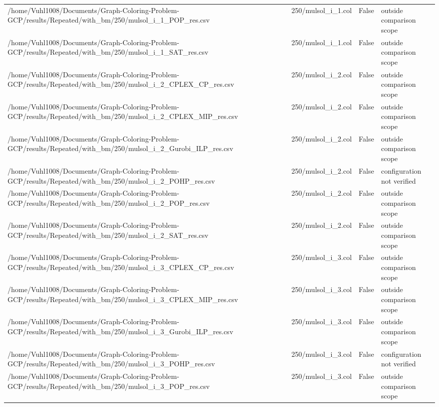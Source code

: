 \begin{table}[htbp]
\begin{tabular}{llll}
/home/Vuhl1008/Documents/Graph-Coloring-Problem-GCP/results/Repeated/with\_bm/250/mulsol\_i\_1\_POP\_res.csv & 250/mulsol\_i\_1.col & False & outside comparison scope \\
/home/Vuhl1008/Documents/Graph-Coloring-Problem-GCP/results/Repeated/with\_bm/250/mulsol\_i\_1\_SAT\_res.csv & 250/mulsol\_i\_1.col & False & outside comparison scope \\
/home/Vuhl1008/Documents/Graph-Coloring-Problem-GCP/results/Repeated/with\_bm/250/mulsol\_i\_2\_CPLEX\_CP\_res.csv & 250/mulsol\_i\_2.col & False & outside comparison scope \\
/home/Vuhl1008/Documents/Graph-Coloring-Problem-GCP/results/Repeated/with\_bm/250/mulsol\_i\_2\_CPLEX\_MIP\_res.csv & 250/mulsol\_i\_2.col & False & outside comparison scope \\
/home/Vuhl1008/Documents/Graph-Coloring-Problem-GCP/results/Repeated/with\_bm/250/mulsol\_i\_2\_Gurobi\_ILP\_res.csv & 250/mulsol\_i\_2.col & False & outside comparison scope \\
/home/Vuhl1008/Documents/Graph-Coloring-Problem-GCP/results/Repeated/with\_bm/250/mulsol\_i\_2\_POHP\_res.csv & 250/mulsol\_i\_2.col & False & configuration not verified \\
/home/Vuhl1008/Documents/Graph-Coloring-Problem-GCP/results/Repeated/with\_bm/250/mulsol\_i\_2\_POP\_res.csv & 250/mulsol\_i\_2.col & False & outside comparison scope \\
/home/Vuhl1008/Documents/Graph-Coloring-Problem-GCP/results/Repeated/with\_bm/250/mulsol\_i\_2\_SAT\_res.csv & 250/mulsol\_i\_2.col & False & outside comparison scope \\
/home/Vuhl1008/Documents/Graph-Coloring-Problem-GCP/results/Repeated/with\_bm/250/mulsol\_i\_3\_CPLEX\_CP\_res.csv & 250/mulsol\_i\_3.col & False & outside comparison scope \\
/home/Vuhl1008/Documents/Graph-Coloring-Problem-GCP/results/Repeated/with\_bm/250/mulsol\_i\_3\_CPLEX\_MIP\_res.csv & 250/mulsol\_i\_3.col & False & outside comparison scope \\
/home/Vuhl1008/Documents/Graph-Coloring-Problem-GCP/results/Repeated/with\_bm/250/mulsol\_i\_3\_Gurobi\_ILP\_res.csv & 250/mulsol\_i\_3.col & False & outside comparison scope \\
/home/Vuhl1008/Documents/Graph-Coloring-Problem-GCP/results/Repeated/with\_bm/250/mulsol\_i\_3\_POHP\_res.csv & 250/mulsol\_i\_3.col & False & configuration not verified \\
/home/Vuhl1008/Documents/Graph-Coloring-Problem-GCP/results/Repeated/with\_bm/250/mulsol\_i\_3\_POP\_res.csv & 250/mulsol\_i\_3.col & False & outside comparison scope \\

\end{tabular}
\end{table}
